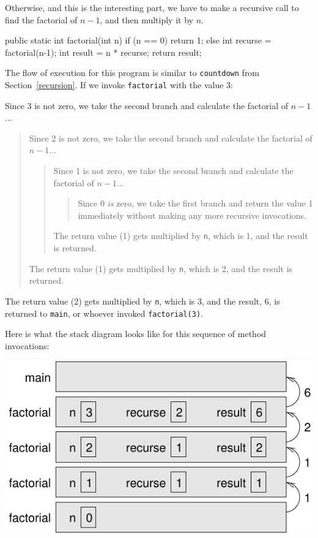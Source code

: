 Otherwise, and this is the interesting part, we have to make
a recursive call to find the factorial of $n-1$, and then
multiply it by $n$.

\begin{code}
  public static int factorial(int n) {
    if (n == 0) {
      return 1;
    } else {
      int recurse = factorial(n-1);
      int result = n * recurse;
      return result;
    }
  }
\end{code}

The flow of execution for this program is similar to {\tt countdown}
from Section~\ref{recursion}.
If we invoke {\tt factorial} with the value 3:

Since 3 is not zero, we take the second branch and calculate
the factorial of $n-1$...

\begin{quote}
Since 2 is not zero, we take the second branch and calculate
the factorial of $n-1$...

\begin{quote}
Since 1 is not zero, we take the second branch and calculate
the factorial of $n-1$...

\begin{quote}
Since 0 {\em is} zero, we take the first branch and return
the value 1 immediately without making any more recursive
invocations.

\end{quote}

The return value (1) gets multiplied by {\tt n}, which is 1,
and the result is returned.

\end{quote}

The return value (1) gets multiplied by {\tt n}, which is 2,
and the result is returned.

\end{quote}

\noindent The return value (2) gets multiplied by {\tt n}, which is 3,
and the result, 6, is returned to {\tt main}, or whoever
invoked {\tt factorial(3)}.


Here is what the stack diagram looks like for this sequence of
method invocations:

\includegraphics{figs/stack3.pdf}


